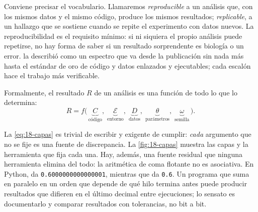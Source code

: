 Conviene precisar el vocabulario. Llamaremos \emph{reproducible} a un análisis que, con los mismos datos y el mismo código, produce los mismos resultados; \emph{replicable}, a un hallazgo que se sostiene cuando se repite el experimento con datos nuevos. La reproducibilidad es el requisito mínimo: si ni siquiera el propio análisis puede repetirse, no hay forma de saber si un resultado sorprendente es biología o un error. \textcite{c18-peng2011} la describió como un espectro que va desde la publicación sin nada más hasta el estándar de oro de código y datos enlazados y ejecutables; cada escalón hace el trabajo más verificable.

Formalmente, el resultado $R$ de un análisis es una función de todo lo que lo determina:
\begin{equation}\label{eq:18-capas}
R = f\big(\,\underbrace{C}_{\text{código}},\;\underbrace{\mathcal{E}}_{\text{entorno}},\;\underbrace{D}_{\text{datos}},\;\underbrace{\theta}_{\text{parámetros}},\;\underbrace{\omega}_{\text{semilla}}\,\big).
\end{equation}

\begin{simbolos}
\end{simbolos}

La \cref{eq:18-capas} es trivial de escribir y exigente de cumplir: \emph{cada} argumento que no se fije es una fuente de discrepancia. La \cref{fig:18-capas} muestra las capas y la herramienta que fija cada una. Hay, además, una fuente residual que ninguna herramienta elimina del todo: la aritmética de coma flotante no es asociativa. En Python,  da \texttt{0.6000000000000001}, mientras que  da \texttt{0.6}. Un programa que suma en paralelo en un orden que depende de qué hilo termina antes puede producir resultados que difieren en el último decimal entre ejecuciones; lo sensato es documentarlo y comparar resultados con tolerancias, no bit a bit.

